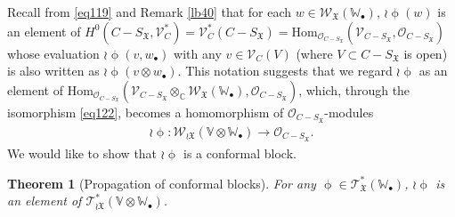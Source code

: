 \documentclass[12pt,b5paper,notitlepage]{report}
\theoremstyle{definition}
\theoremstyle{plain}
\newtheorem{thm}[df]{Theorem}
\newcommand{\fk}{\mathfrak}
\newcommand{\Hom}{\mathrm{Hom}}
\newcommand{\scr}{\mathscr}
\newcommand{\blt}{\bullet}
\newcommand{\Vbb}{\mathbb V}
\newcommand{\Wbb}{\mathbb W}
\newcommand{\Cbb}{\mathbb C}
\numberwithin{equation}{section}
\begin{document}
Recall from \eqref{eq119} and Remark \ref{lb40} that for each $w\in\scr W_{\fk X}(\Wbb_\blt)$, $\wr\upphi(w)$ is an element of $H^0(C-S_{\fk X},\scr V_C^*)=\scr V_C^*(C-S_{\fk X})=\Hom_{\scr O_{C-S_{\fk X}}}(\scr V_{C-S_{\fk X}},\scr O_{C-S_{\fk X}})$ whose evaluation $\wr\upphi(v,w_\blt)$ with any $v\in\scr V_C(V)$ (where $V\subset C-S_{\fk X}$ is open) is also written as $\wr\upphi(v\otimes w_\blt)$. This notation suggests that we regard $\wr\upphi$ as an element of $\Hom_{\scr O_{C-S_{\fk X}}}(\scr V_{C-S_{\fk X}}\otimes_\Cbb\scr W_{\fk X}(\Wbb_\blt),\scr O_{C-S_{\fk X}})$, which, through the isomorphism \eqref{eq122}, becomes a homomorphism of $\scr O_{C-S_{\fk X}}$-modules 
\begin{align*}
\wr\upphi:\scr W_{\wr\fk X}(\Vbb\otimes\Wbb_\blt)\rightarrow\scr O_{C-S_{\fk X}}.
\end{align*}
We would like to show that $\wr\upphi$ is a conformal block.



\begin{thm}[Propagation of conformal blocks]\label{lb126}
For any $\upphi\in\scr T_{\fk X}^*(\Wbb_\blt)$, $\wr\upphi$ is an element of $\scr T_{\wr\fk X}^*(\Vbb\otimes\Wbb_\blt)$. 
\end{thm}
\end{document}
